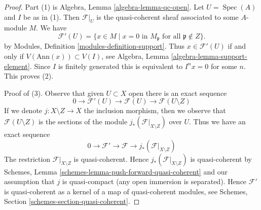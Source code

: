 \documentclass[10pt,a4paper]{amsart}
\theoremstyle{plain}
\theoremstyle{definition}
\theoremstyle{remark}
\numberwithin{equation}{subsection}
\def\Spec{\mathop{\mathrm{Spec}}}
\begin{document}
\begin{proof}
Part (1) is Algebra, Lemma \ref{algebra-lemma-qc-open}.
Let $U = \Spec(A)$ and $I$ be as in (1).
Then $\mathcal{F}|_U$ is the quasi-coherent sheaf associated to
some $A$-module $M$. We have
$$
\mathcal{F}'(U) = \{x \in M \mid x = 0\text{ in }M_\mathfrak p
\text{ for all }\mathfrak p \not \in Z\}.
$$
by Modules, Definition \ref{modules-definition-support}. Thus
$x \in \mathcal{F}'(U)$ if and only if $V(\text{Ann}(x)) \subset V(I)$, see
Algebra, Lemma \ref{algebra-lemma-support-element}. Since $I$ is
finitely generated this is equivalent to $I^n x = 0$ for some $n$.
This proves (2).

\medskip\noindent
Proof of (3). Observe that given $U \subset X$ open there is an exact sequence
$$
0 \to \mathcal{F}'(U) \to \mathcal{F}(U) \to \mathcal{F}(U \setminus Z)
$$
If we denote $j : X \setminus Z \to X$ the inclusion morphism, then
we observe that $\mathcal{F}(U \setminus Z)$ is the sections of the
module $j_*(\mathcal{F}|_{X \setminus Z})$ over $U$. Thus we have
an exact sequence
$$
0 \to \mathcal{F}' \to \mathcal{F} \to j_*(\mathcal{F}|_{X \setminus Z})
$$
The restriction $\mathcal{F}|_{X \setminus Z}$ is quasi-coherent.
Hence $j_*(\mathcal{F}|_{X \setminus Z})$ is quasi-coherent
by Schemes, Lemma \ref{schemes-lemma-push-forward-quasi-coherent}
and our assumption that $j$ is quasi-compact (any open immersion
is separated). Hence $\mathcal{F}'$ is quasi-coherent
as a kernel of a map of quasi-coherent modules, see
Schemes, Section \ref{schemes-section-quasi-coherent}.
\end{proof}
\end{document}
